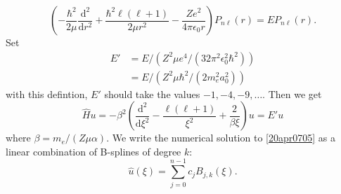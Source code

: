 \documentclass[twocolumn]{article}
\begin{document}
\begin{large}
\begin{equation}
    \left(-\frac{\hbar^2}{2\mu}\frac{\text{d}^2}{\text{d}r^2} + \frac{\hbar^2\ell(\ell+1)}{2\mu r^2} - \frac{Ze^2}{4\pi\epsilon_0r}\right)P_{n\ell}(r) = EP_{n\ell}(r).
\end{equation}
Set 
\begin{equation}
    \begin{split}
        E' &= E/\left(Z^2\mu e^4/(32\pi^2\epsilon_0^2\hbar^2)\right)  \\ 
        &= E/\left(Z^2\mu\hbar^2/(2m_e^2a_0^2)\right)
    \end{split}
\end{equation}
with this defintion, $E'$ should take the values $-1,-4,-9,\dots$.  
Then we get 
\begin{equation}
    \label{20apr0705}
    \hat{H}u = -\beta^2\left(\frac{\text{d}^2}{\text{d}\xi^2}-\frac{\ell(\ell+1)}{\xi^2}+\frac{2}{\beta\xi}\right)u = E'u
\end{equation}
where $\beta = m_e/(Z\mu\alpha)$. We write the numerical solution to \eqref{20apr0705} as a linear combination of B-splines of degree $k$:
\begin{equation}
    \hat{u}(\xi) = \sum_{j=0}^{n-1}c_jB_{j,k}(\xi).
\end{equation}


















\end{large}
\end{document}
